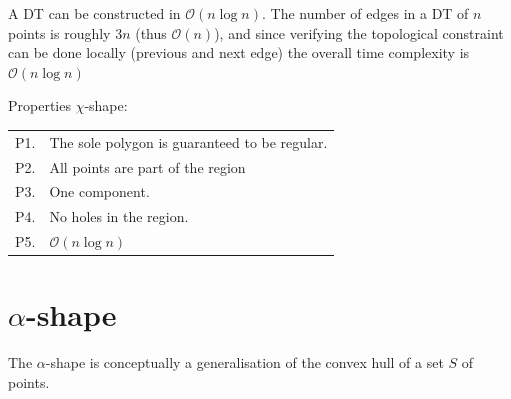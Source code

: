 %

A DT can be constructed in $\mathcal{O}(n \log n)$.
The number of edges in a DT of $n$ points is roughly $3n$ (thus $\mathcal{O}(n)$), and since verifying the topological constraint can be done locally (previous and next edge) the overall time complexity is $\mathcal{O}(n \log n)$

Properties $\chi$-shape:
\\
\begin{tabular}{@{}ll@{}}
\toprule
  P1. & The sole polygon is guaranteed to be regular.  \\  
  P2. & All points are part of the region \\ 
  P3. & One component.  \\ 
  P4. & No holes in the region.  \\  
  P5. & $\mathcal{O}(n \log n)$  \\  
\bottomrule
\end{tabular}


%
\section{$\alpha$-shape}

The $\alpha$-shape is conceptually a generalisation of the convex hull of a set $S$ of points.

%

